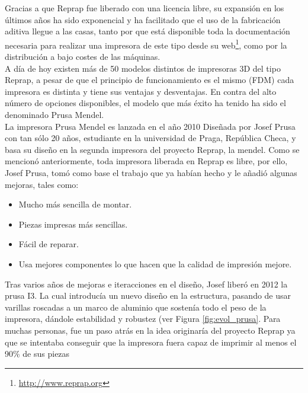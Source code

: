 Gracias a que Reprap fue liberado con una licencia libre, su expansión en los últimos años ha sido exponencial y ha facilitado que el uso de la fabricación aditiva llegue a las casas, tanto por que está disponible toda la documentación necesaria para realizar una impresora de este tipo desde su web\footnote{\url{http://www.reprap.org}}, como por la distribución a bajo costes de las máquinas.\\

A día de hoy existen más de 50 modelos distintos de impresoras 3D del tipo Reprap, a pesar de que el principio de funcionamiento es el mismo (FDM) cada impresora es distinta y tiene sus ventajas y desventajas. En contra del alto número de opciones disponibles, el modelo que más éxito ha tenido ha sido el denominado Prusa Mendel.\\

La impresora Prusa Mendel es lanzada en el año 2010 Diseñada por Josef Prusa con tan sólo 20 años, estudiante en la universidad de Praga, República Checa, y basa su diseño en la segunda impresora del proyecto Reprap, la mendel. Como se mencionó anteriormente, toda impresora liberada en Reprap es libre, por ello, Josef Prusa, tomó como base el trabajo que ya habían hecho y le añadió algunas mejoras, tales como:

\begin{itemize}
    \item Mucho más sencilla de montar.
    \item Piezas impresas más sencillas.
    \item Fácil de reparar.
    \item Usa mejores componentes lo que hacen que la calidad de impresión mejore.
\end{itemize}

Tras varios años de mejoras e iteracciones en el diseño, Josef liberó en 2012 la prusa I3. La cual introducía un nuevo diseño en la estructura, pasando de usar varillas roscadas a un marco de aluminio que sostenía todo el peso de la impresora, dándole estabilidad y robustez (ver Figura \ref{fig:evol_prusa}. Para muchas personas, fue un paso atrás en la idea originaría del proyecto Reprap ya que se intentaba conseguir que la impresora fuera capaz de imprimir al menos el 90\% de sus piezas

